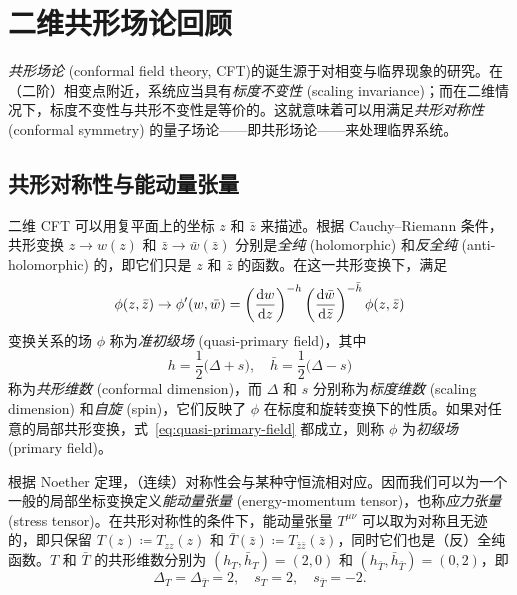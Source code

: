 \section{二维共形场论回顾}
\label{sec:cft-review}

\emph{共形场论} (conformal field theory, CFT)\cite{belavin1984infinite,ginsparg1988applied,francesco2012conformal}的诞生源于对相变与临界现象的研究。在（二阶）相变点附近，系统应当具有\emph{标度不变性} (scaling invariance)；而在二维情况下，标度不变性与共形不变性是等价的。这就意味着可以用满足\emph{共形对称性} (conformal symmetry) 的量子场论——即共形场论——来处理临界系统。

\subsection{共形对称性与能动量张量}

二维 CFT 可以用复平面上的坐标 $z$ 和 $\bar{z}$ 来描述。根据 Cauchy--Riemann 条件，共形变换 $z\to w(z)$ 和 $\bar{z}\to\bar{w}(\bar{z})$ 分别是\emph{全纯} (holomorphic) 和\emph{反全纯} (anti-holomorphic) 的，即它们只是 $z$ 和 $\bar{z}$ 的函数。在这一共形变换下，满足
\begin{equation}
  \phi(z,\bar{z}) \to \phi'(w,\bar{w}) =
  \left( \frac{\mathrm{d}w}{\mathrm{d}z} \right)^{-h} \left( \frac{\mathrm{d}\bar{w}}{\mathrm{d}\bar{z}} \right)^{-\bar{h}} \phi(z,\bar{z})
  \label{eq:quasi-primary-field}
\end{equation}
变换关系的场 $\phi$ 称为\emph{准初级场} (quasi-primary field)，其中
\begin{equation}
  h = \frac12 \bigl( \Delta+s \bigr), \quad \bar{h} = \frac12 \bigl( \Delta-s \bigr)
\end{equation}
称为\emph{共形维数} (conformal dimension)，而 $\Delta$ 和 $s$ 分别称为\emph{标度维数} (scaling dimension) 和\emph{自旋} (spin)，它们反映了 $\phi$ 在标度和旋转变换下的性质。如果对任意的局部共形变换，式~\eqref{eq:quasi-primary-field} 都成立，则称 $\phi$ 为\emph{初级场} (primary field)。

根据 Noether 定理，（连续）对称性会与某种守恒流相对应。因而我们可以为一个一般的局部坐标变换定义\emph{能动量张量} (energy-momentum tensor)，也称\emph{应力张量} (stress tensor)。在共形对称性的条件下，能动量张量 $T^{\mu\nu}$ 可以取为对称且无迹的，即只保留 $T(z)\coloneq T_{zz}(z)$ 和 $\bar{T}(\bar{z})\coloneq T_{\bar{z}\bar{z}}(\bar{z})$，同时它们也是（反）全纯函数\cite{ginsparg1988applied,cardy2010conformal,francesco2012conformal}。$T$ 和 $\bar{T}$ 的共形维数分别为 $(h_T,\bar{h}_T)=(2,0)$ 和 $(h_{\bar{T}},\bar{h}_{\bar{T}})=(0,2)$，即
\begin{equation}
  \Delta_T = \Delta_{\bar{T}} = 2, \quad s_T = 2, \quad s_{\bar{T}} = -2.
\end{equation}

